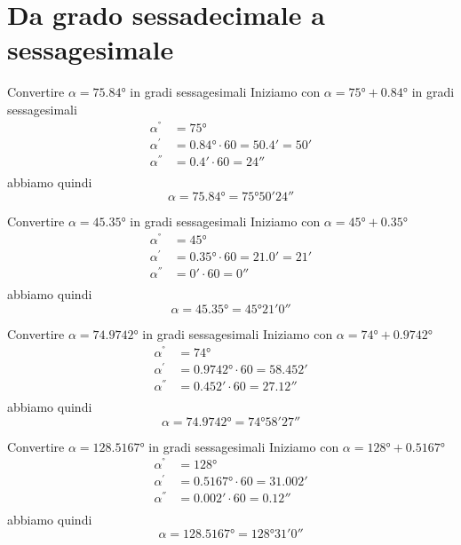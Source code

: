 \section{Da grado sessadecimale a sessagesimale}
\tcbstartrecording
\begin{exercise}
	Convertire $\alpha=\ang{75.84}$ in gradi sessagesimali
	\tcblower
	Iniziamo con
	$\alpha=\ang{75}+\ang{0.84}$ in gradi sessagesimali
	\begin{align*}
	\alpha^{\si{\degree}}&=\ang{75}\\ 
	\alpha^{\si{\arcminute}}&=\ang{0.84}\cdot 60=\ang{;50.4;}=\ang{;50;}\\
	\alpha^{\si{\arcsecond}}&=\ang{;0.4;}\cdot 60=\ang{;;24}\\
	\end{align*}
	abbiamo quindi
	\[\alpha=\ang{75.84}=\ang{75;50;24}\]
\end{exercise}
\begin{exercise}
Convertire $\alpha=\ang{45.35}$ in gradi sessagesimali
	\tcblower
Iniziamo con 
$\alpha=\ang{45}+\ang{0.35}$
\begin{align*}
\alpha^{\si{\degree}}&=\ang{45}\\ 
\alpha^{\si{\arcminute}}&=\ang{0.35}\cdot 60=\ang{;21.0;}=\ang{;21;}\\
\alpha^{\si{\arcsecond}}&=\ang{;0;}\cdot 60=\ang{;;0}\\
\end{align*}
abbiamo quindi
\[\alpha=\ang{45.35}=\ang{45;21;0}\]
\end{exercise}
\begin{exercise}
	Convertire $\alpha=\ang{74.9742}$ in gradi sessagesimali
	\tcblower
	Iniziamo con 
	$\alpha=\ang{74}+\ang{0.9742}$
	\begin{align*}
	\alpha^{\si{\degree}}&=\ang{74}\\ 
	\alpha^{\si{\arcminute}}&=\ang{0.9742}\cdot 60=\ang{;58.452;}\\
	\alpha^{\si{\arcsecond}}&=\ang{;0.452;}\cdot 60=\ang{;;27.12}\\
	\end{align*}
	abbiamo quindi
	\[\alpha=\ang{74.9742}=\ang{74;58;27}\]
\end{exercise}
\begin{exercise}
	Convertire $\alpha=\ang{128.5167}$ in gradi sessagesimali
	\tcblower
	Iniziamo con 
	$\alpha=\ang{128}+\ang{0.5167}$
	\begin{align*}
	\alpha^{\si{\degree}}&=\ang{128}\\ 
	\alpha^{\si{\arcminute}}&=\ang{0.5167}\cdot 60=\ang{;31.002;}\\
	\alpha^{\si{\arcsecond}}&=\ang{;0.002;}\cdot 60=\ang{;;0.12}\\
	\end{align*}
	abbiamo quindi
	\[\alpha=\ang{128.5167}=\ang{128;31;0}\]
\end{exercise}
